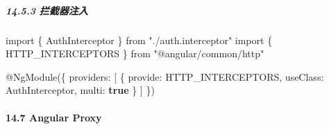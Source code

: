 \documentclass[
]{article}
\newenvironment{Shaded}{}{}
\newcommand{\DataTypeTok}[1]{\textcolor[rgb]{0.56,0.13,0.00}{#1}}
\newcommand{\FunctionTok}[1]{\textcolor[rgb]{0.02,0.16,0.49}{#1}}
\newcommand{\ImportTok}[1]{#1}
\newcommand{\KeywordTok}[1]{\textcolor[rgb]{0.00,0.44,0.13}{\textbf{#1}}}
\newcommand{\NormalTok}[1]{#1}
\newcommand{\OperatorTok}[1]{\textcolor[rgb]{0.40,0.40,0.40}{#1}}
\newcommand{\StringTok}[1]{\textcolor[rgb]{0.25,0.44,0.63}{#1}}
\begin{document}
\hypertarget{1453-ux62e6ux622aux5668ux6ce8ux5165}{%
\subparagraph{14.5.3
拦截器注入}\label{1453-ux62e6ux622aux5668ux6ce8ux5165}}

\begin{Shaded}
\begin{Highlighting}[]
\ImportTok{import}\NormalTok{ \{ AuthInterceptor \} }\ImportTok{from} \StringTok{"./auth.interceptor"}
\ImportTok{import}\NormalTok{ \{ HTTP\_INTERCEPTORS \} }\ImportTok{from} \StringTok{"@angular/common/http"}

\NormalTok{@}\FunctionTok{NgModule}\NormalTok{(\{}
  \DataTypeTok{providers}\OperatorTok{:}\NormalTok{ [}
\NormalTok{    \{}
      \DataTypeTok{provide}\OperatorTok{:}\NormalTok{ HTTP\_INTERCEPTORS}\OperatorTok{,}
      \DataTypeTok{useClass}\OperatorTok{:}\NormalTok{ AuthInterceptor}\OperatorTok{,}
      \DataTypeTok{multi}\OperatorTok{:} \KeywordTok{true}
\NormalTok{    \}}
\NormalTok{  ]}
\NormalTok{\})}
\end{Highlighting}
\end{Shaded}

\hypertarget{147-angular-proxy}{%
\paragraph{14.7 Angular Proxy}\label{147-angular-proxy}}
\end{document}
